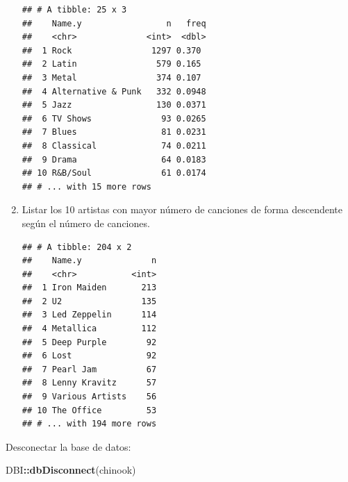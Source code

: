 \documentclass[]{book}
\newenvironment{Shaded}{\begin{snugshade}}{\end{snugshade}}
\newcommand{\KeywordTok}[1]{\textcolor[rgb]{0.13,0.29,0.53}{\textbf{#1}}}
\newcommand{\DataTypeTok}[1]{\textcolor[rgb]{0.13,0.29,0.53}{#1}}
\newcommand{\StringTok}[1]{\textcolor[rgb]{0.31,0.60,0.02}{#1}}
\newcommand{\OperatorTok}[1]{\textcolor[rgb]{0.81,0.36,0.00}{\textbf{#1}}}
\newcommand{\NormalTok}[1]{#1}
\begin{document}
\begin{enumerate}
\begin{verbatim}
## # A tibble: 25 x 3
##    Name.y                 n   freq
##    <chr>              <int>  <dbl>
##  1 Rock                1297 0.370 
##  2 Latin                579 0.165 
##  3 Metal                374 0.107 
##  4 Alternative & Punk   332 0.0948
##  5 Jazz                 130 0.0371
##  6 TV Shows              93 0.0265
##  7 Blues                 81 0.0231
##  8 Classical             74 0.0211
##  9 Drama                 64 0.0183
## 10 R&B/Soul              61 0.0174
## # ... with 15 more rows
\end{verbatim}
\item
  Listar los 10 artistas con mayor número de canciones de forma
  descendente según el número de canciones.

\begin{Shaded}
\end{Shaded}

\begin{verbatim}
## # A tibble: 204 x 2
##    Name.y              n
##    <chr>           <int>
##  1 Iron Maiden       213
##  2 U2                135
##  3 Led Zeppelin      114
##  4 Metallica         112
##  5 Deep Purple        92
##  6 Lost               92
##  7 Pearl Jam          67
##  8 Lenny Kravitz      57
##  9 Various Artists    56
## 10 The Office         53
## # ... with 194 more rows
\end{verbatim}
\end{enumerate}

Desconectar la base de datos:

\begin{Shaded}
\begin{Highlighting}[]
\NormalTok{DBI}\OperatorTok{::}\KeywordTok{dbDisconnect}\NormalTok{(chinook)            }
\end{Highlighting}
\end{Shaded}
\end{document}
